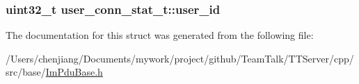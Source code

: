 \subsubsection[{user\+\_\+id}]{\setlength{\rightskip}{0pt plus 5cm}uint32\+\_\+t user\+\_\+conn\+\_\+stat\+\_\+t\+::user\+\_\+id}\label{structuser__conn__stat__t_a3be00a936749eae9b3ff83578109c902}


The documentation for this struct was generated from the following file\+:\begin{DoxyCompactItemize}
\item 
/\+Users/chenjiang/\+Documents/mywork/project/github/\+Team\+Talk/\+T\+T\+Server/cpp/src/base/\hyperlink{_im_pdu_base_8h}{Im\+Pdu\+Base.\+h}\end{DoxyCompactItemize}
